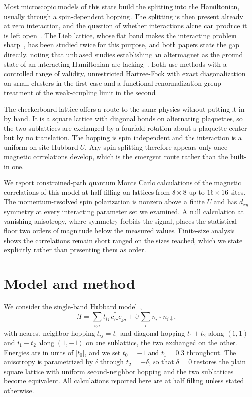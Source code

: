 \documentclass[aps,prb,reprint,superscriptaddress,amsmath,amssymb,floatfix]{revtex4-2}
\begin{document}
Most microscopic models of this state build the splitting into the Hamiltonian,
usually through a spin-dependent hopping. The splitting is then present already
at zero interaction, and the question of whether interactions alone can produce
it is left open~\cite{Leeb2024}. The Lieb lattice, whose flat band makes the
interacting problem sharp~\cite{Lieb1989,Mielke1991,Tasaki1992}, has been studied
twice for this purpose, and both papers state the gap directly,
noting that unbiased studies establishing an altermagnet as the ground state of
an interacting Hamiltonian are lacking~\cite{Kaushal2025,Duerrnagel2025}. Both
use methods with a controlled range of validity, unrestricted Hartree-Fock with
exact diagonalization on small clusters in the first case and a functional
renormalization group treatment of the weak-coupling limit in the second.

The checkerboard lattice offers a route to the same physics without putting it in
by hand. It is a square lattice with diagonal bonds on alternating plaquettes, so
the two sublattices are exchanged by a fourfold rotation about a plaquette center
but by no translation. The hopping is spin independent and the interaction is a
uniform on-site Hubbard $U$. Any spin splitting therefore appears only once
magnetic correlations develop, which is the emergent route rather than the
built-in one.

We report constrained-path quantum Monte Carlo calculations of the magnetic
correlations of this model at half filling on lattices from $8\times8$ up to
$16\times16$ sites. The momentum-resolved spin polarization is nonzero above a
finite $U$ and has $d_{xy}$ symmetry at every interacting parameter set we
examined. A null calculation at vanishing anisotropy, where symmetry forbids the
signal, places the statistical floor two orders of magnitude below the measured
values. Finite-size analysis shows the correlations remain short ranged on the
sizes reached, which we state explicitly rather than presenting them as order.

\section{Model and method}
\label{sec:model}

We consider the single-band Hubbard model~\cite{Hubbard1963,Arovas2022},
\begin{equation}
H = \sum_{ij\sigma} t_{ij}\, c^{\dagger}_{i\sigma} c^{\phantom{\dagger}}_{j\sigma}
    + U \sum_i n_{i\uparrow} n_{i\downarrow},
\label{eq:H}
\end{equation}
with nearest-neighbor hopping $t_{ij} = t_0$ and diagonal hopping $t_1 + t_2$
along $(1,1)$ and $t_1 - t_2$ along $(1,-1)$ on one sublattice, the two exchanged
on the other. Energies are in units of $|t_0|$, and we set $t_0 = -1$ and
$t_1 = 0.3$ throughout. The anisotropy is parametrized by $\delta$ through
$t_2 = -\delta$, so that $\delta = 0$ restores the plain square lattice with
uniform second-neighbor hopping and the two sublattices become equivalent. All
calculations reported here are at half filling unless stated otherwise.
\end{document}
